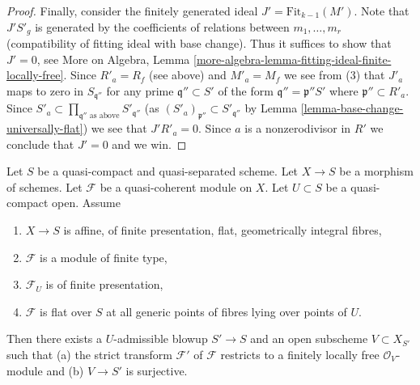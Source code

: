 \begin{proof}
\medskip\noindent
Finally, consider the finitely generated ideal $J' = \text{Fit}_{k - 1}(M')$.
Note that $J'S'_g$ is generated by the coefficients of relations between
$m_1, \ldots, m_r$ (compatibility of fitting ideal with base change).
Thus it suffices to show that $J' = 0$, see
More on Algebra, Lemma
\ref{more-algebra-lemma-fitting-ideal-finite-locally-free}.
Since $R'_a = R_f$ (see above) and $M'_a = M_f$ we see from (3)
that $J'_a$ maps to zero in $S_{\mathfrak q''}$ for any prime
$\mathfrak q'' \subset S'$ of the form $\mathfrak q'' = \mathfrak p''S'$
where $\mathfrak p'' \subset R'_a$. Since
$S'_a \subset \prod_{\mathfrak q''\text{ as above}} S'_{\mathfrak q''}$
(as $(S'_a)_{\mathfrak p''} \subset S'_{\mathfrak q''}$ by
Lemma \ref{lemma-base-change-universally-flat})
we see that $J'R'_a = 0$. Since $a$ is a nonzerodivisor in $R'$ we
conclude that $J' = 0$ and we win.
\end{proof}

\begin{lemma}
\label{lemma-flatten-module-pre}
Let $S$ be a quasi-compact and quasi-separated scheme.
Let $X \to S$ be a morphism of schemes.
Let $\mathcal{F}$ be a quasi-coherent module on $X$.
Let $U \subset S$ be a quasi-compact open. Assume
\begin{enumerate}
\item $X \to S$ is affine, of finite presentation, flat,
geometrically integral fibres,
\item $\mathcal{F}$ is a module of finite type,
\item $\mathcal{F}_U$ is of finite presentation,
\item $\mathcal{F}$ is flat over $S$ at all generic points of
fibres lying over points of $U$.
\end{enumerate}
Then there exists a $U$-admissible blowup $S' \to S$
and an open subscheme $V \subset X_{S'}$
such that (a) the strict transform $\mathcal{F}'$ of $\mathcal{F}$
restricts to a finitely locally free $\mathcal{O}_V$-module and
(b) $V \to S'$ is surjective.
\end{lemma}

